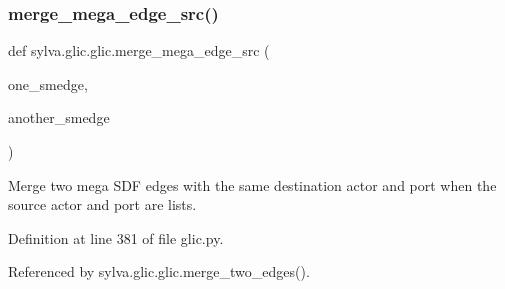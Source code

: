 \subsubsection{\texorpdfstring{merge\+\_\+mega\+\_\+edge\+\_\+src()}{merge\_mega\_edge\_src()}}
{\footnotesize\ttfamily def sylva.\+glic.\+glic.\+merge\+\_\+mega\+\_\+edge\+\_\+src (\begin{DoxyParamCaption}\item[{}]{one\+\_\+smedge,  }\item[{}]{another\+\_\+smedge }\end{DoxyParamCaption})}

\begin{DoxyVerb}  Merge two mega SDF edges
  with the same destination actor and port
  when the source actor and port are lists.
\end{DoxyVerb}
 

Definition at line 381 of file glic.\+py.



Referenced by sylva.\+glic.\+glic.\+merge\+\_\+two\+\_\+edges().


